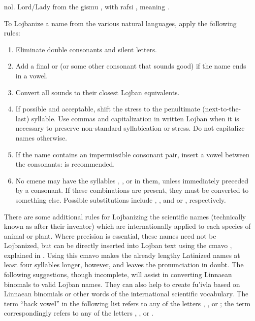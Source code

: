 \begin{example}
nol.\n
Lord/Lady\n
from the gismu , with rafsi , meaning .
\end{example}

To Lojbanize a name from the various natural languages, apply the following rules: 
\begin{enumerate}
\item Eliminate double consonants and silent letters.
\item Add a final  or  (or some other consonant that sounds good) if the name ends in a vowel.
\item Convert all sounds to their closest Lojban equivalents.
\item If possible and acceptable, shift the stress to the penultimate (next-to-the-last) syllable. Use commas and capitalization in written Lojban when it is necessary to preserve non-standard syllabication or stress. Do not capitalize names otherwise.
\item If the name contains an impermissible consonant pair, insert a vowel between the consonants:  is recommended.
\item No cmene may have the syllables , , or  in them, unless immediately preceded by a consonant. If these combinations are present, they must be converted to something else. Possible substitutions include , , and  or , respectively.
\end{enumerate}

There are some additional rules for Lojbanizing the scientific names (technically known as  after their inventor) which are internationally applied to each species of animal or plant. Where precision is essential, these names need not be Lojbanized, but can be directly inserted into Lojban text using the cmavo , explained in . Using this cmavo makes the already lengthy Latinized names at least four syllables longer, however, and leaves the pronunciation in doubt. The following suggestions, though incomplete, will assist in converting Linnaean binomals to valid Lojban names. They can also help to create fu'ivla based on Linnaean binomials or other words of the international scientific vocabulary. The term ``back vowel'' in the following list refers to any of the letters , , or ; the term  correspondingly refers to any of the letters , , or . 

